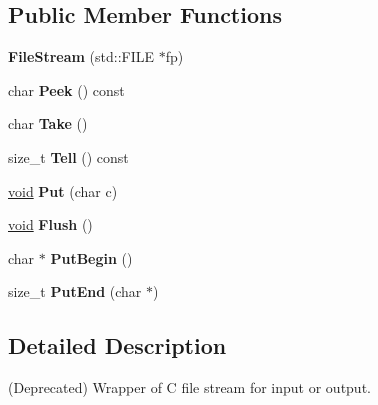 \subsection*{Public Member Functions}
\begin{DoxyCompactItemize}
\item 
\hypertarget{class_file_stream_a6fde58817cd007440c8b9e68e5affb97}{}{\bfseries File\+Stream} (std\+::\+F\+I\+L\+E $\ast$fp)\label{class_file_stream_a6fde58817cd007440c8b9e68e5affb97}

\item 
\hypertarget{class_file_stream_a847ee1a11a13e27bfb86cc8bff308431}{}char {\bfseries Peek} () const \label{class_file_stream_a847ee1a11a13e27bfb86cc8bff308431}

\item 
\hypertarget{class_file_stream_a73acfe1397558b60afcee732e63a9087}{}char {\bfseries Take} ()\label{class_file_stream_a73acfe1397558b60afcee732e63a9087}

\item 
\hypertarget{class_file_stream_a1ca8441cfc5ff2602c16b6dd04a4b4bf}{}size\+\_\+t {\bfseries Tell} () const \label{class_file_stream_a1ca8441cfc5ff2602c16b6dd04a4b4bf}

\item 
\hypertarget{class_file_stream_ae8af9a5c2a5982c6dd19dde23a6d455e}{}\hyperlink{_s_d_l__audio_8h_a52835ae37c4bb905b903cbaf5d04b05f}{void} {\bfseries Put} (char c)\label{class_file_stream_ae8af9a5c2a5982c6dd19dde23a6d455e}

\item 
\hypertarget{class_file_stream_aa1258c8c83aec85987ab5866f222bafd}{}\hyperlink{_s_d_l__audio_8h_a52835ae37c4bb905b903cbaf5d04b05f}{void} {\bfseries Flush} ()\label{class_file_stream_aa1258c8c83aec85987ab5866f222bafd}

\item 
\hypertarget{class_file_stream_a0d8ed908ea40a634fb2f6b510d9d115e}{}char $\ast$ {\bfseries Put\+Begin} ()\label{class_file_stream_a0d8ed908ea40a634fb2f6b510d9d115e}

\item 
\hypertarget{class_file_stream_a627c5916b0b977069baf4f1e76f43e45}{}size\+\_\+t {\bfseries Put\+End} (char $\ast$)\label{class_file_stream_a627c5916b0b977069baf4f1e76f43e45}

\end{DoxyCompactItemize}


\subsection{Detailed Description}
(Deprecated) Wrapper of C file stream for input or output. 

